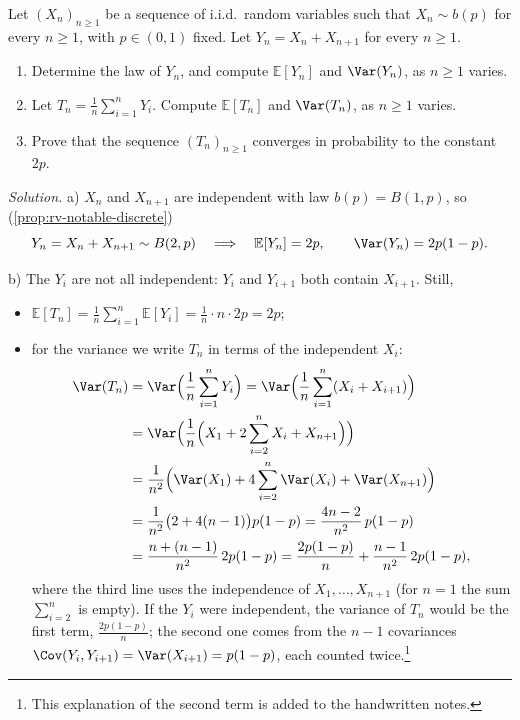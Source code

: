 \begin{example}\label{exa:cl-relaxed-lln}
Let $(X_n)_{n\ge1}$ be a sequence of i.i.d.\ random variables such that $X_n\sim b(p)$ for every
$n\ge1$, with $p\in(0,1)$ fixed. Let $Y_n=X_n+X_{n+1}$ for every $n\ge1$.
\begin{enumerate}[label=\alph*)]
  \item Determine the law of $Y_n$, and compute $\mathbb E[Y_n]$ and $\Var(Y_n)$, as $n\ge1$
    varies.
  \item Let $T_n=\frac1n\sum_{i=1}^nY_i$. Compute $\mathbb E[T_n]$ and $\Var(T_n)$, as $n\ge1$
    varies.
  \item Prove that the sequence $(T_n)_{n\ge1}$ converges in probability to the constant $2p$.
\end{enumerate}

\emph{Solution.} a) $X_n$ and $X_{n+1}$ are independent with law $b(p)=B(1,p)$, so
(\cref{prop:rv-notable-discrete})
\[
  Y_n=X_n+X_{n+1}\sim B(2,p)\quad\Longrightarrow\quad\mathbb E[Y_n]=2p,\qquad\Var(Y_n)=2p(1-p).
\]

b) The $Y_i$ are not all independent: $Y_i$ and $Y_{i+1}$ both contain $X_{i+1}$. Still,
\begin{itemize}
  \item $\displaystyle\mathbb E[T_n]=\frac1n\sum_{i=1}^n\mathbb E[Y_i]=\frac1n\cdot n\cdot2p=2p$;
  \item for the variance we write $T_n$ in terms of the independent $X_i$:
    \[
    \begin{aligned}
      \Var(T_n)&=\Var\Big(\frac1n\sum_{i=1}^nY_i\Big)=\Var\Big(\frac1n\sum_{i=1}^n(X_i+X_{i+1})\Big)\\
      &=\Var\Big(\frac1n\Big(X_1+2\sum_{i=2}^nX_i+X_{n+1}\Big)\Big)\\
      &=\frac1{n^2}\Big(\Var(X_1)+4\sum_{i=2}^n\Var(X_i)+\Var(X_{n+1})\Big)\\
      &=\frac1{n^2}\big(2+4(n-1)\big)p(1-p)=\frac{4n-2}{n^2}\,p(1-p)\\
      &=\frac{n+(n-1)}{n^2}\,2p(1-p)=\frac{2p(1-p)}n+\frac{n-1}{n^2}\,2p(1-p),
    \end{aligned}
    \]
    where the third line uses the independence of $X_1,\dots,X_{n+1}$ (for $n=1$ the sum
    $\sum_{i=2}^n$ is empty). If the $Y_i$ were independent, the variance of $T_n$ would be
    the first term, $\frac{2p(1-p)}n$; the second one comes from the $n-1$ covariances
    $\Cov(Y_i,Y_{i+1})=\Var(X_{i+1})=p(1-p)$, each counted twice.\footnote{This explanation of
    the second term is added to the handwritten notes.}
\end{itemize}


\end{example}
